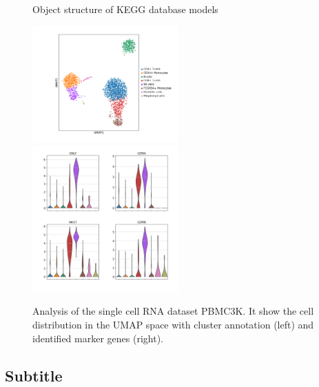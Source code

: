 \documentclass[11pt,a4paper]{article}
\begin{document}
\begin{figure}


    \caption{Object structure of KEGG database models}
\end{figure}

\lipsum[3-4]


\begin{figure}

    \includegraphics[width=0.5\textwidth, valign=t]{figure2.png}
    \includegraphics[width=0.5\textwidth, valign=t]{figure3.png}

    \caption{Analysis of the single cell RNA dataset PBMC3K. It show the cell distribution in the UMAP space with
    cluster annotation (left) and identified marker genes (right).
    }
\end{figure}



\subsection*{Subtitle}
\lipsum[4-5]
\end{document}
